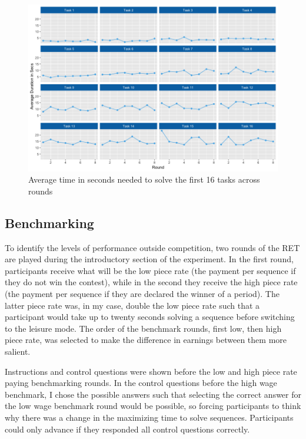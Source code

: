     \begin{figure}[h]
        \centering
        \includegraphics[width = \textwidth]{graphs/avg_time_per_task_round.png}
        \caption{Average time in seconds needed to solve the first 16 tasks across rounds}
        \label{fig:avg_time_task}
    \end{figure}
    
    
    \subsection{Benchmarking}
    \label{ss:benchmarking}
    
    To identify the levels of performance outside competition, two rounds of the RET are played during the introductory section of the experiment. In the first round, participants receive what will be the low piece rate (the payment per sequence if they do not win the contest), while in the second they receive the high piece rate (the payment per sequence if they are declared the winner of a period). The latter piece rate was, in my case, double the low piece rate such that a participant would take up to twenty seconds solving a sequence before switching to the leisure mode. The order of the benchmark rounds, first low, then high piece rate, was selected to make the difference in earnings between them more salient.
    
    Instructions and control questions were shown before the low and high piece rate paying benchmarking rounds. In the control questions before the high wage benchmark, I chose the possible answers such that selecting the correct answer for the low wage benchmark round would be possible, so forcing participants to think why there was a change in the maximizing time to solve sequences. Participants could only advance if they responded all control questions correctly.
    
